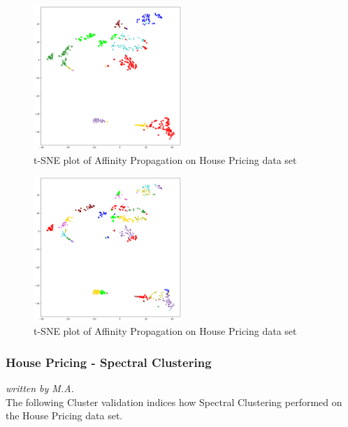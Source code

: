 \begin{figure}[H]
		\begin{center}
			\includegraphics[width=0.5\textwidth]{images/af_housepricing71433.png}
		\end{center}
		\caption{t-SNE plot of Affinity Propagation on House Pricing data set}
		\label{fig:af_house1}
	\end{figure}
	
	\begin{figure}[H]
			\begin{center}
				\includegraphics[width=0.5\textwidth]{images/af_housepricing6900.png}
			\end{center}
			\caption{t-SNE plot of Affinity Propagation on House Pricing data set}
			\label{fig:afhouse2}
		\end{figure}

\subsubsection{House Pricing - Spectral Clustering}
\textit{written by M.A.}\\

The following Cluster validation indices how Spectral Clustering performed on the House Pricing data set. \newline
 
